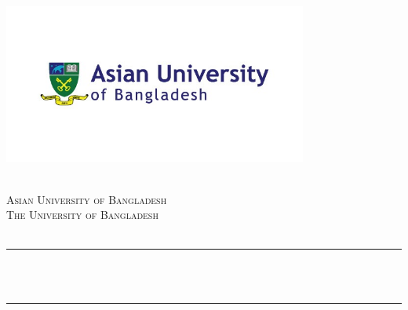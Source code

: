 \begin{titlepage}

    \newcommand{\HRule}{\rule{\linewidth}{0.5mm}} %
    
    
    \includegraphics[width=10cm]{0_title/social-share.jpeg}\\[0.5cm] %
     
    
    \center %
    
    
    \textsc{\LARGE \doctype}\\[1.5cm] %
    \textsc{\Large Asian University of Bangladesh}\\[0.5cm] %
    \textsc{\Large The University of Bangladesh}\\[0.5cm] %
    \textsc{\large \department}\\[0.5cm] %
    
    \makeatletter
    \HRule \\[0.4cm]
    { \huge \bfseries \@title}\\[0.4cm] %
    \HRule \\[1.5cm]
     

\end{titlepage}
